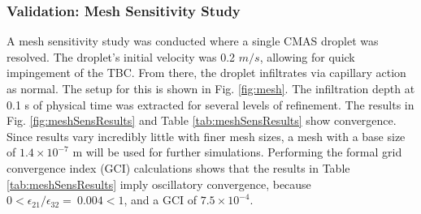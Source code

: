 \documentclass{UCF_ETD}
\begin{document}
\subsubsection{Validation: Mesh Sensitivity Study}
A mesh sensitivity study was conducted where a single CMAS droplet was resolved. The droplet's initial velocity was 0.2 $m/s$, allowing for quick impingement of the TBC. From there, the droplet infiltrates via capillary action as normal. The setup for this is shown in Fig. \ref{fig:mesh}. The infiltration depth at 0.1 s of physical time was extracted for several levels of refinement. The results in Fig. \ref{fig:meshSensResults} and Table \ref{tab:meshSensResults} show convergence. Since results vary incredibly little with finer mesh sizes, a mesh with a base size of ${1.4\times 10^{-7}}$ m will be used for further simulations. Performing the formal grid convergence index (GCI) calculations \cite{ECA2014104, celik2008procedure} shows that the results in Table \ref{tab:meshSensResults} imply oscillatory convergence, because  $0<\epsilon_{21}/\epsilon_{32}=\ 0.004<1$, and a GCI of $7.5\times 10^{-4}$.

\end{document}
